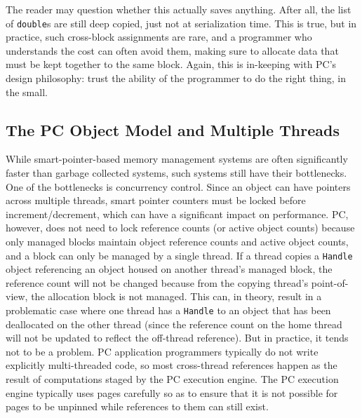 The reader may question whether this actually saves anything.  After
all, the list of \texttt{double}s are still deep copied, just not at serialization time.
This is true, but in practice, such cross-block assignments are rare, and a programmer who understands the cost can often avoid them, making sure to allocate
data that must be kept together to the same block.
Again, this is in-keeping with PC's design philosophy: trust the ability of the programmer to do the right thing, in the small.

\subsection{The PC Object Model and Multiple Threads}

While smart-pointer-based memory management
systems are often significantly faster than garbage collected systems, such systems still have their bottlenecks.  One of the bottlenecks is concurrency
control.
Since an object can have pointers across multiple threads, smart pointer counters must be locked before increment/decrement, which
can have a significant impact on performance.  PC, however, does not need to lock reference counts (or active object counts) because only managed blocks maintain
object reference counts and active object counts,
and a block can only be managed by a single thread.  
If a thread copies a \texttt{Handle} object referencing an object housed on another thread's managed block, 
the reference count will not be changed because from the copying thread's point-of-view, the allocation block is not managed.
This can, in theory, result in a problematic case where one thread has a \texttt{Handle} to an object that has been deallocated on the other thread (since
the reference count on the home thread will not be updated to reflect the off-thread reference).  But in practice, it tends not to be a problem.  PC application
programmers typically do not write explicitly multi-threaded code, so most cross-thread references happen as the result of computations staged by the 
PC execution engine.  The PC execution engine typically uses pages carefully so as to ensure that 
it is not possible for pages to be unpinned while references to them can still exist.

